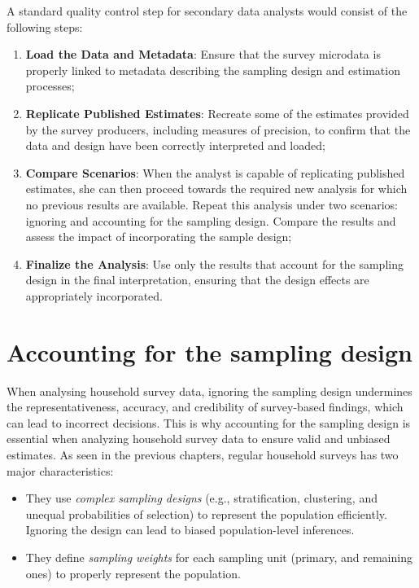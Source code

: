 \documentclass[
  12pt,
]{book}
\begin{document}
A standard quality control step for secondary data analysts would consist of the following steps:

\begin{enumerate}
\def\labelenumi{\arabic{enumi}.}
\item
  \textbf{Load the Data and Metadata}: Ensure that the survey microdata is properly linked to metadata describing the sampling design and estimation processes;
\item
  \textbf{Replicate Published Estimates}: Recreate some of the estimates provided by the survey producers, including measures of precision, to confirm that the data and design have been correctly interpreted and loaded;
\item
  \textbf{Compare Scenarios}: When the analyst is capable of replicating published estimates, she can then proceed towards the required new analysis for which no previous results are available. Repeat this analysis under two scenarios: ignoring and accounting for the sampling design. Compare the results and assess the impact of incorporating the sample design;
\item
  \textbf{Finalize the Analysis}: Use only the results that account for the sampling design in the final interpretation, ensuring that the design effects are appropriately incorporated.
\end{enumerate}

\hypertarget{accounting-for-the-sampling-design}{%
\chapter{Accounting for the sampling design}\label{accounting-for-the-sampling-design}}

When analysing household survey data, ignoring the sampling design undermines the representativeness, accuracy, and credibility of survey-based findings, which can lead to incorrect decisions. This is why accounting for the sampling design is essential when analyzing household survey data to ensure valid and unbiased estimates. As seen in the previous chapters, regular household surveys has two major characteristics:

\begin{itemize}
\item
  They use \emph{complex sampling designs} (e.g., stratification, clustering, and unequal probabilities of selection) to represent the population efficiently. Ignoring the design can lead to biased population-level inferences.
\item
  They define \emph{sampling weights} for each sampling unit (primary, and remaining ones) to properly represent the population.
\end{itemize}
\end{document}
